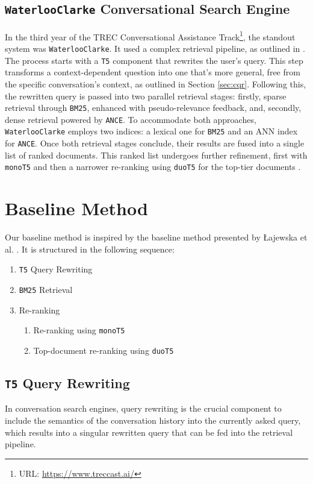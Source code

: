 \documentclass[sigconf]{acmart}
\begin{document}
\subsection*{\texttt{WaterlooClarke} Conversational Search Engine}\label{sec:waterlooclarke}
In the third year of the TREC Conversational Assistance Track\footnote{URL: \url{https://www.treccast.ai/}}, the standout system was \texttt{WaterlooClarke}. It used a complex retrieval pipeline, as outlined in \cite{Lajewska:2023:ECIR,yan2021waterlooclarke}. The process starts with a \texttt{T5} component that rewrites the user's query. This step transforms a context-dependent question into one that's more general, free from the specific conversation's context, as outlined in Section \ref{sec:cqr}. Following this, the rewritten query is passed into two parallel retrieval stages: firstly, sparse retrieval through \texttt{BM25}, enhanced with pseudo-relevance feedback, and, secondly, dense retrieval powered by \texttt{ANCE}. To accommodate both approaches, \texttt{WaterlooClarke} employs two indices: a lexical one for \texttt{BM25} and an ANN index for \texttt{ANCE}. Once both retrieval stages conclude, their results are fused into a single list of ranked documents. This ranked list undergoes further refinement, first with \texttt{monoT5} and then a narrower re-ranking using \texttt{duoT5} for the top-tier documents \cite{Lajewska:2023:ECIR,yan2021waterlooclarke}.



\section{Baseline Method}\label{sec:baseline}
Our baseline method is inspired by the baseline method presented by Łajewska et al. \cite{Lajewska:2023:ECIR}. It is structured in the following sequence:
\begin{enumerate}
	\item	\texttt{T5} Query Rewriting
	\item	\texttt{BM25} Retrieval
	\item	Re-ranking
			\begin{enumerate}
				\item	Re-ranking using \texttt{monoT5}
				\item	Top-document re-ranking using \texttt{duoT5}
			\end{enumerate}
\end{enumerate}

\subsection{\texttt{T5} Query Rewriting}
In conversation search engines, query rewriting is the crucial component to include the semantics of the conversation history into the currently asked query, which results into a singular rewritten query that can be fed into the retrieval pipeline.
\end{document}
